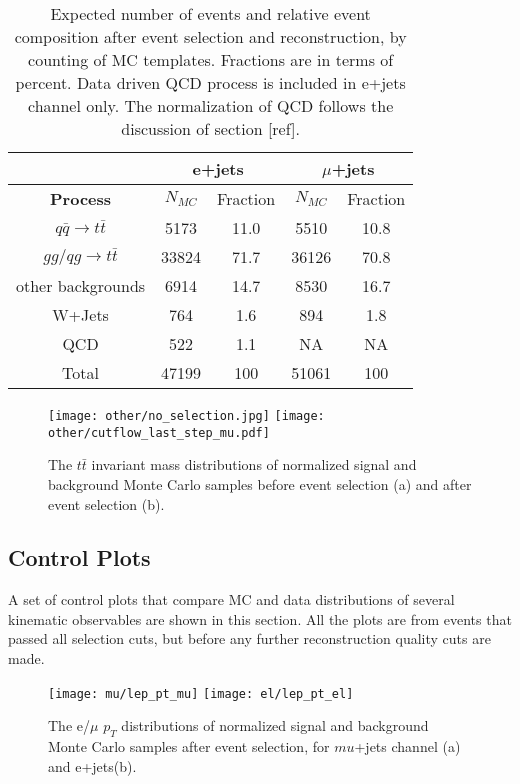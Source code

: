 \begin{table}[h!]
\small
\centering
\begin{tabular}{|c | c  c | c  c|}
\hline
 & \multicolumn{2}{|c|}{e+jets}&\multicolumn{2}{|c|}{$\mu$+jets} \\
\hline
\textbf{Process} & $N_{MC}$ & Fraction & $N_{MC}$ & Fraction \\
\hline
$q\bar{q}\rightarrow t\bar{t}$ & 5173 & 11.0 & 5510 & 10.8 \\
$gg/qg\rightarrow t\bar{t}$ & 33824 & 71.7 & 36126 & 70.8 \\ 
other backgrounds & 6914 & 14.7 & 8530 & 16.7 \\ 
W+Jets & 764 & 1.6 & 894 & 1.8 \\
QCD &522 & 1.1 & NA & NA \\
Total & 47199 & 100 & 51061 & 100 \\
\hline
\end{tabular}
\caption{\small Expected number of events and relative event composition after event selection and reconstruction, by counting of MC templates. Fractions are in terms of percent. Data driven QCD process is included in e+jets channel only. The normalization of QCD follows the discussion of section [ref]. }
\label{tab:mc_fractions}

\end{table}

\begin{figure}[h!]
\texttt{[image: other/no\_selection.jpg]}
\texttt{[image: other/cutflow\_last\_step\_mu.pdf]}
\centering
\caption{\small \small The $t\bar{t}$ invariant mass distributions of normalized signal and background Monte Carlo samples before event selection (a) and after event selection (b). }
\label{tagging_results}
\end{figure}

\subsection{Control Plots}
A set of control plots that compare MC and data distributions of several kinematic observables are shown in this section. All the plots are from events that passed all selection cuts, but before any further reconstruction quality cuts are made. 

\begin{figure}[htb]
\texttt{[image: mu/lep\_pt\_mu]}
\texttt{[image: el/lep\_pt\_el]}
\centering
\caption{\small \small The e/$\mu$ $p_T$ distributions of normalized signal and background Monte Carlo samples after event selection, for $mu$+jets channel (a) and e+jets(b). }
\label{fig:lep_pt}
\end{figure}

